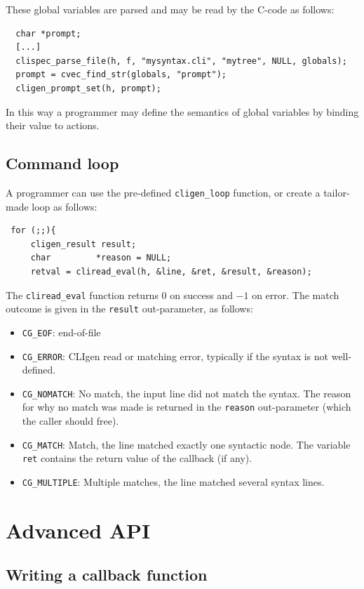 \documentclass[a4paper, 10pt] {article}
\begin{document}
These global variables are parsed and may be read by the C-code as follows:
\begin{verbatim}
  char *prompt;
  [...]
  clispec_parse_file(h, f, "mysyntax.cli", "mytree", NULL, globals);
  prompt = cvec_find_str(globals, "prompt");
  cligen_prompt_set(h, prompt);
\end{verbatim}

In this way a programmer may define the semantics of global variables
by binding their value to actions.

\subsection{Command loop}
\label{sec:main}

A programmer can use the pre-defined {\tt cligen\_loop} function, or create a tailor-made loop as follows:

\begin{verbatim}
 for (;;){
     cligen_result result;
     char         *reason = NULL;
     retval = cliread_eval(h, &line, &ret, &result, &reason);
\end{verbatim}
The {\tt cliread\_eval} function returns $0$ on success and $-1$ on
error. The match outcome is given in the {\tt result} out-parameter, as follows:
\begin{itemize}
\item {\tt CG\_EOF}: end-of-file
\item {\tt CG\_ERROR}: CLIgen read or matching error, typically if the syntax is not well-defined.
\item {\tt CG\_NOMATCH}: No match, the input line did not match the syntax. The reason for why no match was made is returned in the {\tt reason} out-parameter (which the caller should free).
\item {\tt CG\_MATCH}: Match, the line matched exactly one syntactic node. The variable {\tt ret} contains the return value of the callback (if any).
\item {\tt CG\_MULTIPLE}: Multiple matches, the line matched several syntax lines.
\end{itemize}


\section{Advanced API}

\subsection{Writing a callback function}
\end{document}
